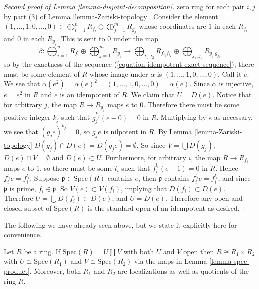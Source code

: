 \begin{proof}[Second proof of Lemma \ref{lemma-disjoint-decomposition}]
zero ring for each pair $i, j$ by part (3) of
Lemma \ref{lemma-Zariski-topology}.
Consider the element
$(1, \ldots, 1, 0, \ldots, 0) \in \bigoplus_{i = 1}^ {n} R_{f_{i}}
\oplus \bigoplus_{j = 1}^{m} R_{g_j}$
whose coordinates are $1$ in each $R_{f_i}$ and
$0$ in each $R_{g_j}$. This is sent to $0$ under the map
$$
\beta : \bigoplus\nolimits_{i = 1}^ {n} R_{f_{i}} \oplus
\bigoplus\nolimits_{j = 1}^{m} R_{g_j}
\rightarrow \bigoplus\nolimits_{i_1, i_2} R_{f_{i_1}f_{i_2}} \oplus
\bigoplus\nolimits_{j_1, j_2}
R_{g_{j_1}g_{j_2}}
$$
so by the exactness of the
sequence (\ref{equation-idempotent-exact-sequence}), there must be some
element of $R$ whose image under $\alpha$ is $(1, \ldots, 1, 0, \ldots, 0)$.
Call it $e$. We see that
$\alpha(e^2) = \alpha(e)^2 = (1, \ldots, 1, 0, \ldots, 0) = \alpha(e)$.
Since $\alpha$ is
injective, $e = e^2$ in $R$ and $e$ is an idempotent of $R$. We claim that
$U = D(e)$.
Notice that for arbitrary $j$, the map $R \rightarrow R_{g_j}$ maps $e$
to $0$. Therefore there must be some positive integer $k_j$ such that
$g_j^{k_j}(e-0) = 0$ in $R$. Multiplying by $e$ as necessary,
we see that $(g_j e)^{k_j} = 0$,
so $g_j e$ is nilpotent in $R$. By
Lemma \ref{lemma-Zariski-topology}
$D(g_j) \cap D(e) = D(g_j e) = \emptyset$. So since
$V = \bigcup D(g_j)$, $D(e) \cap V = \emptyset$ and
$D(e) \subset U$. Furthermore, for arbitrary $i$, the
map $R \rightarrow R_{f_i}$ maps $e$ to $1$, so there must be some $l_i$ such
that $f_i^{l_i}(e-1) =0$ in $R$. Hence $f_i^{l_i}e = f_i^{l_i}$. Suppose
$\mathfrak{p} \in \text{Spec}(R)$ contains $e$,
then $\mathfrak{p}$ contains
$f_i^{l_i}e = f_i^{l_i}$, and since $\mathfrak{p}$ is prime, $f_i \in
\mathfrak{p}$. So $V(e) \subset V(f_i)$, implying that $D(f_i) \subset D(e)$.
Therefore $U = \bigcup D(f_i) \subset D(e)$, and $U = D(e)$.
Therefore any open
and closed subset of $\text{Spec}(R)$ is the standard open
of an idempotent as
desired.
\end{proof}

\noindent
The following we have already seen above, but we state it explicitly here
for convenience.

\begin{lemma}
\label{lemma-disjoint-implies-product}
Let $R$ be a ring.
If $\text{Spec}(R) = U \amalg V$ with both $U$ and $V$ open
then $R \cong R_1 \times R_2$ with $U \cong \text{Spec}(R_1)$
and $V \cong \text{Spec}(R_2)$ via the maps in Lemma \ref{lemma-spec-product}.
Moreover, both $R_1$ and $R_2$ are localizations as well as quotients
of the ring $R$.
\end{lemma}

